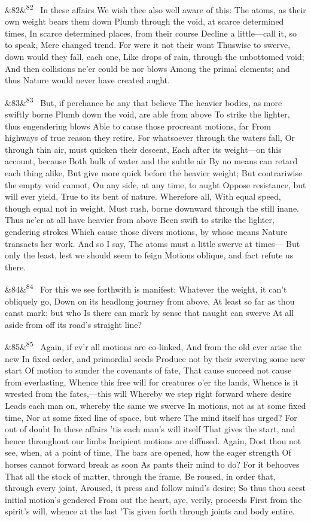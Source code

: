\documentclass[12pt]{article}
\newcommand{\para}[1][]{\par\noindent\ifx&#1&\else\textsuperscript{\footnotesize #1}~\fi}
\begin{document}
\para[82] In these affairs We wish thee also well aware of this: The atoms, as their own weight bears them down Plumb through the void, at scarce determined times, In scarce determined places, from their course Decline a little---call it, so to speak, Mere changed trend. For were it not their wont Thuswise to swerve, down would they fall, each one, Like drops of rain, through the unbottomed void; And then collisions ne'er could be nor blows Among the primal elements; and thus Nature would never have created aught.

\para[83] But, if perchance be any that believe The heavier bodies, as more swiftly borne Plumb down the void, are able from above To strike the lighter, thus engendering blows Able to cause those procreant motions, far From highways of true reason they retire. For whatsoever through the waters fall, Or through thin air, must quicken their descent, Each after its weight---on this account, because Both bulk of water and the subtle air By no means can retard each thing alike, But give more quick before the heavier weight; But contrariwise the empty void cannot, On any side, at any time, to aught Oppose resistance, but will ever yield, True to its bent of nature. Wherefore all, With equal speed, though equal not in weight, Must rush, borne downward through the still inane. Thus ne'er at all have heavier from above Been swift to strike the lighter, gendering strokes Which cause those divers motions, by whose means Nature transacts her work. And so I say, The atoms must a little swerve at times--- But only the least, lest we should seem to feign Motions oblique, and fact refute us there.

\para[84] For this we see forthwith is manifest: Whatever the weight, it can't obliquely go, Down on its headlong journey from above, At least so far as thou canst mark; but who Is there can mark by sense that naught can swerve At all aside from off its road's straight line?

\para[85] Again, if ev'r all motions are co-linked, And from the old ever arise the new In fixed order, and primordial seeds Produce not by their swerving some new start Of motion to sunder the covenants of fate, That cause succeed not cause from everlasting, Whence this free will for creatures o'er the lands, Whence is it wrested from the fates,---this will Whereby we step right forward where desire Leads each man on, whereby the same we swerve In motions, not as at some fixed time, Nor at some fixed line of space, but where The mind itself has urged? For out of doubt In these affairs 'tis each man's will itself That gives the start, and hence throughout our limbs Incipient motions are diffused. Again, Dost thou not see, when, at a point of time, The bars are opened, how the eager strength Of horses cannot forward break as soon As pants their mind to do? For it behooves That all the stock of matter, through the frame, Be roused, in order that, through every joint, Aroused, it press and follow mind's desire; So thus thou seest initial motion's gendered From out the heart, aye, verily, proceeds First from the spirit's will, whence at the last 'Tis given forth through joints and body entire.
\end{document}
